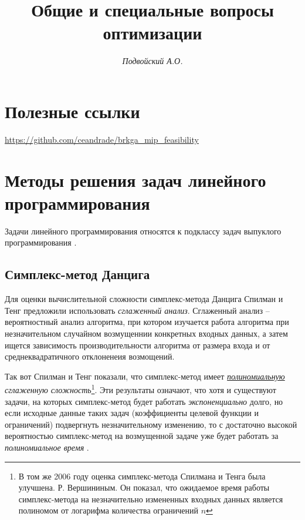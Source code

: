 \documentclass[%
	11pt,
	a4paper,
	utf8,
		]{article}
\begin{document}
\title{Общие и специальные вопросы оптимизации}

\author{\itshape Подвойский А.О.}

\date{}
\maketitle

\thispagestyle{fancy}




\tableofcontents

\section{Полезные ссылки}

\url{https://github.com/ceandrade/brkga_mip_feasibility}

\section{Методы решения задач линейного программирования}

Задачи линейного программирования относятся к подклассу задач выпуклого программирования \cite[]{vorontsova:convex_opt-2021}.

\subsection{Симплекс-метод Данцига}


Для оценки вычислительной сложности симплекс-метода Данцига Спилман и Тенг предложили использовать \emph{сглаженный анализ}. Сглаженный анализ -- вероятностный анализ алгоритма, при котором изучается работа алгоритма при незначительном случайном возмущеннии конкретных входных данных, а затем ищется зависимость производительности алгоритма от размера входа и от среднеквадратичного отклоненеия возмощений.

Так вот Спилман и Тенг показали, что симплекс-метод имеет \emph{\underline{полиномиальную} сглаженную сложность}\footnote{В том же 2006 году оценка симплекс-метода Спилмана и Тенга была улучшена. Р. Вершининым. Он показал, что ожидаемое время работы симплекс-метода на незначительно измененных входных данных является полиномом от логарифма количества ограничений $ n $}. Эти результаты означают, что хотя и существуют задачи, на которых симплекс-метод будет работать \emph{экспоненциально} долго, но если исходные данные таких задач (коэффициенты целевой функции и ограничений) подвергнуть незначительному изменению, то с достаточно высокой вероятностью симплекс-метод на возмущенной задаче уже будет работать за \emph{полиномиальное время} \cite[]{vorontsova:convex_opt-2021}.
\end{document}
